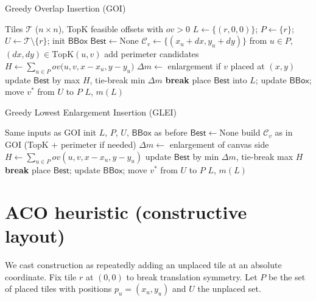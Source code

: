 \documentclass[11pt]{article}
\begin{document}
\begin{algorithm}[H]
\caption{Greedy Overlap Insertion (GOI)}
\begin{algorithmic}[1]
\Require Tiles $\mathcal{T}$ ($n\times n$), TopK feasible offsets with $ov>0$
\State $L \gets \{(r,0,0)\}$; $P\gets\{r\}$; $U\gets\mathcal{T}\setminus\{r\}$; init $\mathsf{BBox}$
  \State $\mathsf{Best}\gets\text{None}$
     \State $\mathcal{C}_v \gets \{(x_u+dx, y_u+dy)\}$ from $u\in P$, $(dx,dy)\in\text{TopK}(u,v)$
      add perimeter candidates \EndIf
           \State $H \gets \sum_{u\in P} ov\big(u,v,x-x_u,y-y_u\big)$
           \State $\Delta m \gets$ enlargement if $v$ placed at $(x,y)$
           \State update $\mathsf{Best}$ by max $H$, tie-break min $\Delta m$
        \EndIf
     \EndFor
  \EndFor
   \textbf{break} \EndIf
  \State place $\mathsf{Best}$ into $L$; update $\mathsf{BBox}$; move $v^*$ from $U$ to $P$
\EndWhile
\State \Return $L$, $m(L)$
\end{algorithmic}
\end{algorithm}

\begin{algorithm}[H]
\caption{Greedy Lowest Enlargement Insertion (GLEI)}
\begin{algorithmic}[1]
\Require Same inputs as GOI
\State init $L$, $P$, $U$, $\mathsf{BBox}$ as before
  \State $\mathsf{Best}\gets\text{None}$
     \State build $\mathcal{C}_v$ as in GOI (TopK + perimeter if needed)
           \State $\Delta m \gets$ enlargement of canvas side
           \State $H \gets \sum_{u\in P} ov(u,v,x-x_u,y-y_u)$
           \State update $\mathsf{Best}$ by min $\Delta m$, tie-break max $H$
        \EndIf
     \EndFor
  \EndFor
   \textbf{break} \EndIf
  \State place $\mathsf{Best}$; update $\mathsf{BBox}$; move $v^*$ from $U$ to $P$
\EndWhile
\State \Return $L$, $m(L)$
\end{algorithmic}
\end{algorithm}

\section{ACO heuristic (constructive layout)}
We cast construction as repeatedly adding an unplaced tile at an absolute coordinate. Fix tile $r$ at $(0,0)$ to break translation symmetry. Let $P$ be the set of placed tiles with positions $p_u=(x_u,y_u)$ and $U$ the unplaced set.
\end{document}

